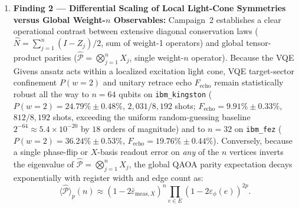\documentclass[aps,pra,reprint,superscriptaddress,floatfix,nofootinbib]{revtex4-2}
\begin{document}
\begin{enumerate}
    \item \textbf{Finding 2 --- Differential Scaling of Local Light-Cone Symmetries versus Global Weight-$n$ Observables:}
    Campaign~2 establishes a clear operational contrast between extensive diagonal conservation laws ($\hat{N} = \sum_{j=1}^n (I - Z_j)/2$, sum of weight-1 operators) and global tensor-product parities ($\hat{\mathcal{P}} = \bigotimes_{j=1}^n X_j$, single weight-$n$ operator). Because the VQE Givens ansatz acts within a localized excitation light cone, VQE target-sector confinement $P(w=2)$ and unitary retrace echo $F_{\text{echo}}$ remain statistically robust all the way to $n = 64$ qubits on \texttt{ibm\_kingston} ($P(w=2) = 24.79\% \pm 0.48\%$, $2,031/8,192$ shots; $F_{\text{echo}} = 9.91\% \pm 0.33\%$, $812/8,192$ shots, exceeding the uniform random-guessing baseline $2^{-64} \approx 5.4 \times 10^{-20}$ by $18$ orders of magnitude) and to $n = 32$ on \texttt{ibm\_fez} ($P(w=2) = 36.24\% \pm 0.53\%$, $F_{\text{echo}} = 19.76\% \pm 0.44\%$). Conversely, because a single phase-flip or $X$-basis readout error on \emph{any} of the $n$ vertices inverts the eigenvalue of $\hat{\mathcal{P}} = \bigotimes_{j=1}^n X_j$, the global QAOA parity expectation decays exponentially with register width and edge count as:
    \begin{equation}
    \langle \hat{\mathcal{P}} \rangle_p(n) \approx \left(1 - 2\bar{\varepsilon}_{\text{meas},X}\right)^n \prod_{e \in E} \left(1 - 2\varepsilon_\phi(e)\right)^{2p}.
    \label{eq:parity_scaling_law}
    \end{equation}

\end{enumerate}
\end{document}
